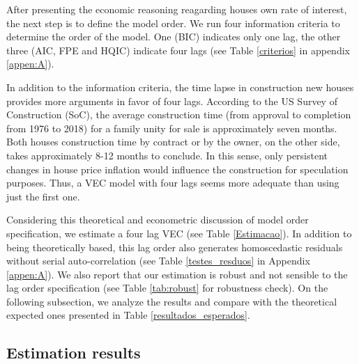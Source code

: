 \documentclass[12pt, a4paper]{article}
\begin{document}
After presenting the economic reasoning reagarding houses own rate of interest,  the next step is to define the model order.
We run four information criteria to determine the order of the model.
One (BIC) indicates only one lag, the other three (AIC, FPE and HQIC) indicate four lags (see Table \ref{criterios} in appendix \ref{appen:A}).

In addition to the information criteria, the time lapse in construction new houses provides more arguments in favor of four lags.
According to the US Survey of Construction (SoC), the average construction time (from approval to completion from 1976 to 2018) for a family unity for sale is approximately seven months.
Both houses construction time by contract or by the owner, on the other side, takes approximately 8-12 months to conclude.
In this sense, only persistent changes in house price inflation would influence the construction for speculation purposes.
Thus, a VEC model with four lags seems more adequate than using just the first one.


Considering this theoretical and econometric discussion of model order specification, we estimate a four lag VEC  (see Table \ref{Estimacao}).
In addition to being theoretically based, this lag order also generates homoscedastic residuals without serial auto-correlation (see Table \ref{testes_resduos} in Appendix \ref{appen:A}).
We also report that our estimation is robust and not sensible to the lag order specification (see Table \ref{tab:robust} for robustness check).
On the following subsection, we analyze the results and compare with the theoretical expected ones presented in Table \ref{resultados_esperados}.


\subsection{Estimation results}
\label{sec:org4558d06}
\label{sec:results}
\end{document}
